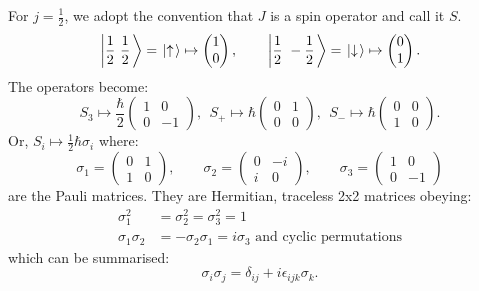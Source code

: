 \documentclass[../Main.tex]{subfiles}
\begin{document}
For $j = \frac12$, we adopt the convention that $J$ is a spin operator and call it $S$.
\begin{equation*}
    \left.\left|\frac12~\frac12\right.\right\rangle = \left.\left|\uparrow\right.\right\rangle \mapsto \begin{pmatrix}1 \\ 0\end{pmatrix},\qquad \left.\left|\frac12~-\frac12\right.\right\rangle = \left.\left|\downarrow\right.\right\rangle \mapsto \begin{pmatrix}0 \\ 1\end{pmatrix}.
\end{equation*}
The operators become:
\begin{equation*}
    S_3 \mapsto \frac{\hbar}{2} \begin{pmatrix}
        1 & 0 \\
        0 & -1
    \end{pmatrix}
    ,~~ S_+ \mapsto \hbar \begin{pmatrix}
        0 & 1 \\
        0 & 0
    \end{pmatrix}
    ,~~S_- \mapsto \hbar \begin{pmatrix}
        0 & 0 \\
        1 & 0
    \end{pmatrix}.
\end{equation*}
Or, $S_i \mapsto \frac12 \hbar \sigma_i$ where:
\begin{equation*}
    \sigma_1 =
    \begin{pmatrix}
        0 & 1 \\
        1 & 0
    \end{pmatrix}
    ,\qquad\sigma_2 =
    \begin{pmatrix}
        0 & -i \\
        i & 0
    \end{pmatrix}
    ,\qquad\sigma_3 =
    \begin{pmatrix}
        1 & 0 \\
        0 & -1
    \end{pmatrix}
\end{equation*}
are the Pauli matrices. They are Hermitian, traceless 2x2 matrices obeying:
\begin{align*}
    \sigma_1^2&= \sigma_2^2 = \sigma_3^2 = 1 \\
    \sigma_1\sigma_2 &= -\sigma_2\sigma_1 = i\sigma_3 \text{ and cyclic permutations}
\end{align*}
which can be summarised:
\begin{equation*}
    \sigma_i \sigma_j = \delta_{ij} + i \epsilon_{ijk} \sigma_k.
\end{equation*}
\end{document}
